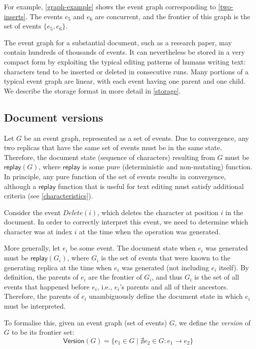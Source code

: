 \documentclass[sigplan,10pt]{acmart}
\begin{document}
For example, \autoref{graph-example} shows the event graph corresponding to \autoref{two-inserts}.
The events $e_5$ and $e_6$ are concurrent, and the frontier of this graph is the set of events $\{e_5, e_6\}$.

The event graph for a substantial document, such as a research paper, may contain hundreds of thousands of events.
It can nevertheless be stored in a very compact form by exploiting the typical editing patterns of humans writing text: characters tend to be inserted or deleted in consecutive runs.
Many portions of a typical event graph are linear, with each event having one parent and one child.
We describe the storage format in more detail in \autoref{storage}.

\subsection{Document versions}\label{versions}

Let $G$ be an event graph, represented as a set of events.
Due to convergence, any two replicas that have the same set of events must be in the same state.
Therefore, the document state (sequence of characters) resulting from $G$ must be $\mathsf{replay}(G)$, where $\mathsf{replay}$ is some pure (deterministic and non-mutating) function.
In principle, any pure function of the set of events results in convergence, although a $\mathsf{replay}$ function that is useful for text editing must satisfy additional criteria (see \autoref{characteristics}).

Consider the event $\mathit{Delete}(i)$, which deletes the character at position $i$ in the document. In order to correctly interpret this event, we need to determine which character was at index $i$ at the time when the operation was generated.

More generally, let $e_i$ be some event. The document state when $e_i$ was generated must be $\mathsf{replay}(G_i)$, where $G_i$ is the set of events that were known to the generating replica at the time when $e_i$ was generated (not including $e_i$ itself).
By definition, the parents of $e_i$ are the frontier of $G_i$, and thus $G_i$ is the set of all events that happened before $e_i$, i.e., $e_i$'s parents and all of their ancestors.
Therefore, the parents of $e_i$ unambiguously define the document state in which $e_i$ must be interpreted.

To formalise this, given an event graph (set of events) $G$, we define the \emph{version} of $G$ to be its frontier set:
\begin{equation*}
  \mathsf{Version}(G) = \{e_1 \in G \mid \nexists e_2 \in G: e_1 \rightarrow e_2\}
\end{equation*}
\end{document}
